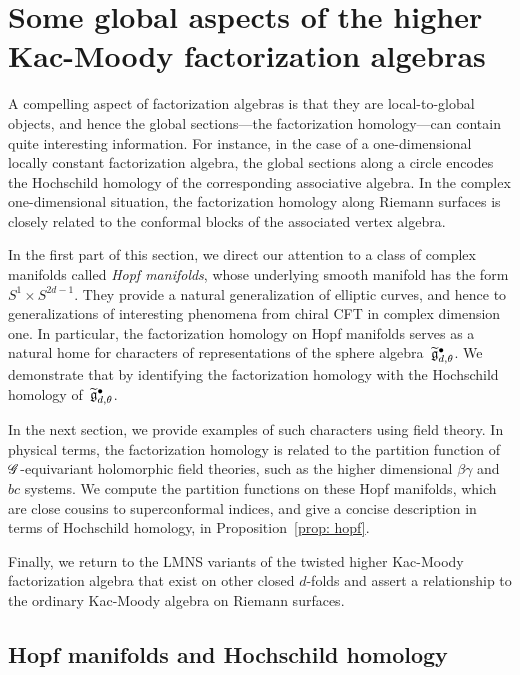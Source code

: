  \section{Some global aspects of the higher Kac-Moody factorization algebras}

A compelling aspect of factorization algebras is that they are local-to-global objects,
and hence the global sections---the factorization homology---can contain quite interesting information.
For instance, in the case of a one-dimensional locally constant factorization algebra, the global sections along a circle encodes the Hochschild homology of the corresponding associative algebra. 
In the complex one-dimensional situation, the factorization homology along Riemann surfaces is closely related to the conformal blocks of the associated vertex algebra. 

In the first part of this section, we direct our attention to a class of complex manifolds called {\em Hopf manifolds},
whose underlying smooth manifold has the form $S^1 \times S^{2d-1}$.
They provide a natural generalization of elliptic curves, and hence to generalizations of interesting phenomena from chiral CFT in complex dimension one.
In particular, the factorization homology on Hopf manifolds serves as a natural home for characters of representations of the sphere algebra~$\widetilde{\mathfrak g}_{d,\theta}^\bullet$.
We demonstrate that by identifying the factorization homology with the Hochschild homology of~$\widetilde{\mathfrak g}_{d,\theta}^\bullet$.

In the next section, we provide examples of such characters using field theory.
In physical terms, the factorization homology is related to the partition function of $\mathscr G$-equivariant holomorphic field theories, such as the higher dimensional $\beta\gamma$ and $bc$ systems.
We compute the partition functions on these Hopf manifolds, which are close cousins to superconformal indices, 
and give a concise description in terms of Hochschild homology, in Proposition~\ref{prop: hopf}. 

Finally, we return to the LMNS variants of the twisted higher Kac-Moody factorization algebra that exist on other closed $d$-folds and assert a relationship to the ordinary Kac-Moody algebra on Riemann surfaces. 

\subsection{Hopf manifolds and Hochschild homology}

